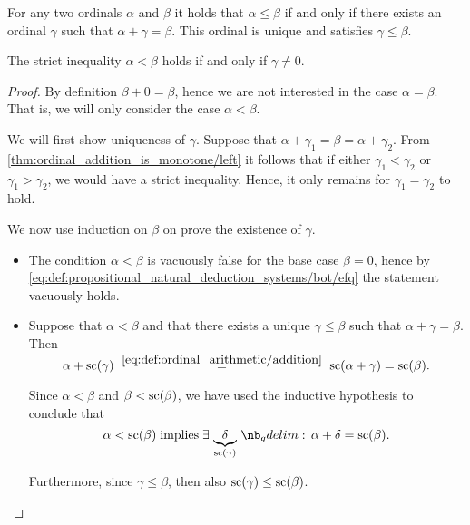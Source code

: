 \begin{proposition}\label{thm:ordinal_ordering_via_addition}
  For any two ordinals \( \alpha \) and \( \beta \) it holds that \( \alpha \leq \beta \) if and only if there exists an ordinal \( \gamma \) such that \( \alpha + \gamma = \beta \). This ordinal is unique and satisfies \( \gamma \leq \beta \).

  The strict inequality \( \alpha < \beta \) holds if and only if \( \gamma \neq 0 \).
\end{proposition}
\begin{proof}
  \SufficiencySubProof By definition \( \beta + 0 = \beta \), hence we are not interested in the case \( \alpha = \beta \). That is, we will only consider the case \( \alpha < \beta \).

  We will first show uniqueness of \( \gamma \). Suppose that \( \alpha + \gamma_1 = \beta = \alpha + \gamma_2 \). From \eqref{thm:ordinal_addition_is_monotone/left} it follows that if either \( \gamma_1 < \gamma_2 \) or \( \gamma_1 > \gamma_2 \), we would have a strict inequality. Hence, it only remains for \( \gamma_1 = \gamma_2 \) to hold.

  We now use induction on \( \beta \) on prove the existence of \( \gamma \).
  \begin{itemize}
    \item The condition \( \alpha < \beta \) is vacuously false for the base case \( \beta = 0 \), hence by \eqref{eq:def:propositional_natural_deduction_systems/bot/efq} the statement vacuously holds.

    \item Suppose that \( \alpha < \beta \) and that there exists a unique \( \gamma \leq \beta \) such that \( \alpha + \gamma = \beta \). Then
    \begin{equation*}
      \alpha + \op{sc}(\gamma)
      \reloset {\eqref{eq:def:ordinal_arithmetic/addition}} =
      \op{sc}(\alpha + \gamma)
      =
      \op{sc}(\beta).
    \end{equation*}

    Since \( \alpha < \beta \) and \( \beta < \op{sc}(\beta) \), we have used the inductive hypothesis to conclude that
    \begin{equation*}
      \alpha < \op{sc}(\beta) \T{implies} \qexists* {\underbrace{\delta}_{\mathclap{\op{sc}(\gamma)}}} \alpha + \delta = \op{sc}(\beta).
    \end{equation*}

    Furthermore, since \( \gamma \leq \beta \), then also \( \op{sc}(\gamma) \leq \op{sc}(\beta) \).


\end{itemize}
\end{proof}
